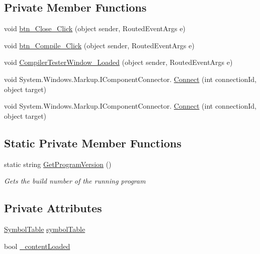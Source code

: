 \subsection*{Private Member Functions}
\begin{DoxyCompactItemize}
\item 
void \hyperlink{class_c_p_u___o_s___simulator_1_1_compiler_tester_1_1_main_window_a8230f868ae44ef7a5099ac14607e330c}{btn\+\_\+\+Close\+\_\+\+Click} (object sender, Routed\+Event\+Args e)
\item 
void \hyperlink{class_c_p_u___o_s___simulator_1_1_compiler_tester_1_1_main_window_af755f7ae0752d06a31b1c30e51a05513}{btn\+\_\+\+Compile\+\_\+\+Click} (object sender, Routed\+Event\+Args e)
\item 
void \hyperlink{class_c_p_u___o_s___simulator_1_1_compiler_tester_1_1_main_window_a9c99afbfd4e46cc2d5f5c6fd499ff3b0}{Compiler\+Tester\+Window\+\_\+\+Loaded} (object sender, Routed\+Event\+Args e)
\item 
void System.\+Windows.\+Markup.\+I\+Component\+Connector. \hyperlink{class_c_p_u___o_s___simulator_1_1_compiler_tester_1_1_main_window_ab83b7c7097d501f2d4d2ce623d257c92}{Connect} (int connection\+Id, object target)
\item 
void System.\+Windows.\+Markup.\+I\+Component\+Connector. \hyperlink{class_c_p_u___o_s___simulator_1_1_compiler_tester_1_1_main_window_ab83b7c7097d501f2d4d2ce623d257c92}{Connect} (int connection\+Id, object target)
\end{DoxyCompactItemize}
\subsection*{Static Private Member Functions}
\begin{DoxyCompactItemize}
\item 
static string \hyperlink{class_c_p_u___o_s___simulator_1_1_compiler_tester_1_1_main_window_a3f7e54b6234457a6c71f6196511061da}{Get\+Program\+Version} ()
\begin{DoxyCompactList}\small\item\em Gets the build number of the running program \end{DoxyCompactList}\end{DoxyCompactItemize}
\subsection*{Private Attributes}
\begin{DoxyCompactItemize}
\item 
\hyperlink{class_c_p_u___o_s___simulator_1_1_compiler_1_1_frontend_1_1_symbols_1_1_symbol_table}{Symbol\+Table} \hyperlink{class_c_p_u___o_s___simulator_1_1_compiler_tester_1_1_main_window_a12ef52cc8436a259d0bb1c29858b100e}{symbol\+Table}
\item 
bool \hyperlink{class_c_p_u___o_s___simulator_1_1_compiler_tester_1_1_main_window_ab5592e604de397f2517ac3754544b6c1}{\+\_\+content\+Loaded}
\end{DoxyCompactItemize}


